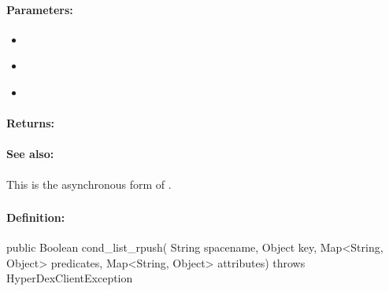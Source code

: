 \paragraph{Parameters:}
\begin{itemize}[noitemsep]
\item {}\\

\item {}\\

\item {}\\

\end{itemize}

\paragraph{Returns:}


\paragraph{See also:}  This is the asynchronous form of .

\pagebreak
\subsubsection{}
\label{api:java:cond_list_rpush}


\paragraph{Definition:}
\begin{javacode}
public Boolean cond_list_rpush(
        String spacename,
        Object key,
        Map<String, Object> predicates,
        Map<String, Object> attributes) throws HyperDexClientException
\end{javacode}

